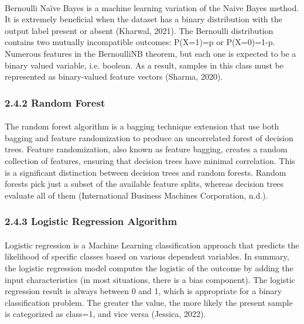 \documentclass[runningheads]{llncs}
\begin{document}
\paragraph{}
\paragraph{}
Bernoulli Naïve Bayes is a machine learning variation of the Naive Bayes method. It is extremely beneficial when the dataset has a binary distribution with the output label present or absent (Kharwal, 2021). The Bernoulli distribution contains two mutually incompatible outcomes: P(X=1)=p or P(X=0)=1-p.  Numerous features in the BernoulliNB theorem, but each one is expected to be a binary valued variable, i.e. boolean. As a result, samples in this class must be represented as binary-valued feature vectors (Sharma, 2020).

\subsubsection{2.4.2 Random Forest}
\paragraph{}
The random forest algorithm is a bagging technique extension that use both bagging and feature randomization to produce an uncorrelated forest of decision trees. Feature randomization, also known as feature bagging, creates a random collection of features, ensuring that decision trees have minimal correlation. This is a significant distinction between decision trees and random forests. Random forests pick just a subset of the available feature splits, whereas decision trees evaluate all of them (International Business Machines Corporation, n.d.).

\subsubsection{2.4.3 Logistic Regression Algorithm}
\paragraph{}
Logistic regression is a Machine Learning classification approach that predicts the likelihood of specific classes based on various dependent variables. In summary, the logistic regression model computes the logistic of the outcome by adding the input characteristics (in most situations, there is a bias component). The logistic regression result is always between 0 and 1, which is appropriate for a binary classification problem. The greater the value, the more likely the present sample is categorized as class=1, and vice versa (Jessica, 2022).
\end{document}
